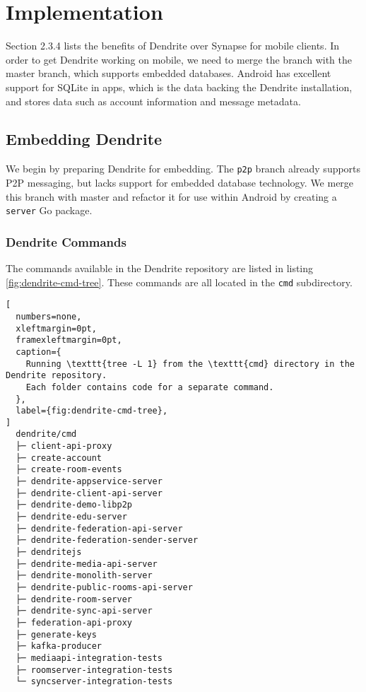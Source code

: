 \chapter{Implementation}
Section 2.3.4 lists the benefits of Dendrite over Synapse for mobile clients.
In order to get Dendrite working on mobile, we need to merge the  branch with the master branch, which supports embedded databases.
Android has excellent support for SQLite in apps, which is the data backing the Dendrite installation, and stores data such as account information and message metadata.

\section{Embedding Dendrite}
We begin by preparing Dendrite for embedding.
The \texttt{p2p} branch already supports \ac{P2P} messaging, but lacks support for embedded database technology.
We merge this branch with master and refactor it for use within Android by creating a \texttt{server} Go package.

\subsection{Dendrite Commands}
The commands available in the Dendrite repository are listed in listing \ref{fig:dendrite-cmd-tree}.
These commands are all located in the \texttt{cmd} subdirectory.


\begin{lstfloat}
  \begin{lstlisting}[
  numbers=none,
  xleftmargin=0pt,
  framexleftmargin=0pt,
  caption={
    Running \texttt{tree -L 1} from the \texttt{cmd} directory in the Dendrite repository.
    Each folder contains code for a separate command.
  },
  label={fig:dendrite-cmd-tree},
]
  dendrite/cmd
  ├─ client-api-proxy
  ├─ create-account
  ├─ create-room-events
  ├─ dendrite-appservice-server
  ├─ dendrite-client-api-server
  ├─ dendrite-demo-libp2p
  ├─ dendrite-edu-server
  ├─ dendrite-federation-api-server
  ├─ dendrite-federation-sender-server
  ├─ dendritejs
  ├─ dendrite-media-api-server
  ├─ dendrite-monolith-server
  ├─ dendrite-public-rooms-api-server
  ├─ dendrite-room-server
  ├─ dendrite-sync-api-server
  ├─ federation-api-proxy
  ├─ generate-keys
  ├─ kafka-producer
  ├─ mediaapi-integration-tests
  ├─ roomserver-integration-tests
  └─ syncserver-integration-tests
\end{lstlisting}
\end{lstfloat}


